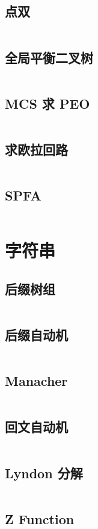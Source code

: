 \documentclass[a4paper,9]{article}
\begin{document}
\subsection{点双}
\inputminted[breaklines]{c++}{graph/bcc.cpp}
\subsection{全局平衡二叉树}
\inputminted[breaklines]{c++}{graph/全局平衡二叉树.cpp}
\subsection{MCS 求 PEO}
\inputminted[breaklines]{c++}{graph/MCS.cpp}
\subsection{求欧拉回路}
\inputminted[breaklines]{c++}{graph/euler_tour.cpp}
\subsection{SPFA}
\inputminted[breaklines]{c++}{graph/spfa.cpp}

\section{字符串}
\subsection{后缀树组}
\inputminted[breaklines]{c++}{string/sa.cpp}
\subsection{后缀自动机}
\inputminted[breaklines]{c++}{string/sam.cpp}
\subsection{Manacher}
\inputminted[breaklines]{c++}{string/manacher.cpp}
\subsection{回文自动机}
\inputminted[breaklines]{c++}{string/pam.cpp}
\subsection{Lyndon 分解}
\inputminted[breaklines]{c++}{string/lyndon.cpp}
\subsection{Z Function}
\inputminted[breaklines]{c++}{string/z_func.cpp}
\end{document}
